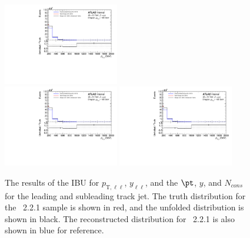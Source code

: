 \begin{figure}
  \includegraphics[page=93,width=0.45\textwidth]{figures/IBUPlots.pdf} \\
  \includegraphics[page=99,width=0.45\textwidth]{figures/IBUPlots.pdf}
  \includegraphics[page=100,width=0.45\textwidth]{figures/IBUPlots.pdf}
  \caption{The results of the IBU for $p_{\text{T},\ell\ell}$, $y_{\ell\ell}$, and the $\pt$, $y$, and $N_{cons}$ for the leading and subleading track jet. The truth distribution for the \sherpa~2.2.1 sample is shown in red, and the unfolded distribution is shown in black. The reconstructed distribution for \sherpa~2.2.1 is also shown in blue for reference.}
  \label{fig:UnfoldIBU1}
\end{figure}

